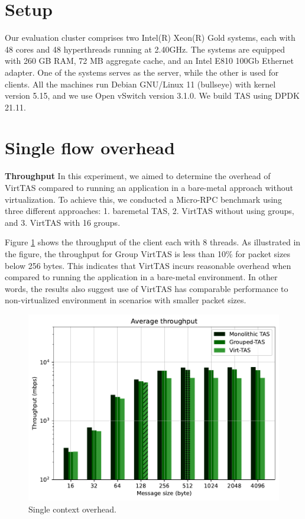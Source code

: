 \section{Setup}

Our evaluation cluster comprises two Intel(R) Xeon(R) Gold systems, 
each with 48 cores and 48 hyperthreads running at 2.40GHz. The systems 
are equipped with 260 GB RAM, 72 MB aggregate cache, and an Intel E810 
100Gb Ethernet adapter. One of the systems serves as the server, while 
the other is used for clients. All the machines run Debian GNU/Linux 11 
(bullseye) with kernel version 5.15, and we use Open vSwitch version 3.1.0. 
We build TAS using DPDK 21.11.

\section{Single flow overhead}

\textbf{Throughput}
In this experiment, we aimed to determine the overhead of VirtTAS compared 
to running an application in a bare-metal approach without virtualization. 
To achieve this, we conducted a Micro-RPC benchmark using three different approaches:
1. baremetal TAS, 2. VirtTAS without using groups, and 3. VirtTAS with 16 groups.

Figure \ref{fig:overhead.throughput} shows the throughput of the client each 
with 8 threads. As illustrated in the figure, the throughput for Group VirtTAS
 is less than 10\% for packet sizes below 256 bytes. This indicates that VirtTAS 
incurs reasonable overhead when compared to running the application in a bare-metal environment. 
In other words, the results also suggest use of VirtTAS has comparable performance 
to non-virtualized environment in scenarios with smaller packet sizes.


\begin{figure}[H]
    \centering
    \includegraphics[scale=0.8]{../results/overhead.throughput.pdf}
    \caption{Single context overhead.}
    \label{fig:overhead.throughput}
\end{figure}


